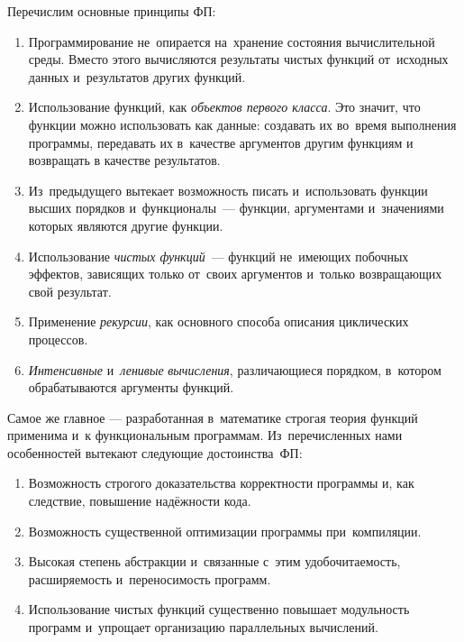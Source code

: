Перечислим основные принципы ФП:

\begin{enumerate}
 \item Программирование не~опирается на~хранение состояния вычислительной среды. Вместо этого вычисляются результаты чистых функций от~исходных данных и~результатов других функций.

 \item Использование функций, как \emph{объектов первого класса}. Это значит, что функции можно использовать как данные: создавать их во~время выполнения программы, передавать их в~качестве аргументов другим функциям и возвращать в качестве результатов.

 \item Из~предыдущего вытекает возможность писать и~использовать функции высших порядков и~функционалы~--- функции, аргументами и~значениями которых являются другие функции.

 \item Использование \emph{чистых функций}~--- функций не~имеющих побочных эффектов, зависящих только от~своих аргументов и~только возвращающих свой результат.

 \item Применение \emph{рекурсии}, как основного способа описания циклических процессов.

 \item \emph{Интенсивные} и~\emph{ленивые} \emph{вычисления}, различающиеся порядком, в~котором обрабатываются аргументы функций.

\end{enumerate}

Самое же главное --- разработанная в~математике строгая теория функций применима и~к функциональным программам. Из~перечисленных нами особенностей вытекают следующие достоинства~ФП:

\begin{enumerate}
 \item Возможность строгого доказательства корректности программы и, как следствие, повышение надёжности кода.

 \item Возможность существенной оптимизации программы при~компиляции.

 \item Высокая степень абстракции и~связанные с~этим удобочитаемость, расширяемость и~переносимость программ.

 \item Использование чистых функций существенно повышает модульность программ и~упрощает организацию параллельных вычислений.
\end{enumerate}

